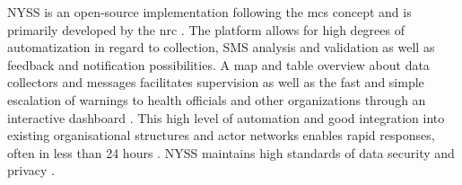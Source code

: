 
NYSS is an open-source implementation following the \acrshort*{mcs} concept and is primarily developed by the \acrshort*{nrc} \autocite{nrcNyssToolDeveloped2022}. The platform allows for high degrees of automatization in regard to collection, SMS analysis and validation as well as feedback and notification possibilities. A map and table overview about data collectors and messages facilitates supervision as well as the fast and simple escalation of warnings to health officials and other organizations through an interactive dashboard \autocite{nrcNYSSCommunitybasedSurveillance2021,nrcWhatNyss2023}. This high level of automation and good integration into existing organisational structures and actor networks enables rapid responses, often in less than 24 hours \autocite{jungCommunityBasedSurveillance2022}. NYSS maintains high standards of data security and privacy \autocite{quinnNyssDATAPROTECTION2020}.

